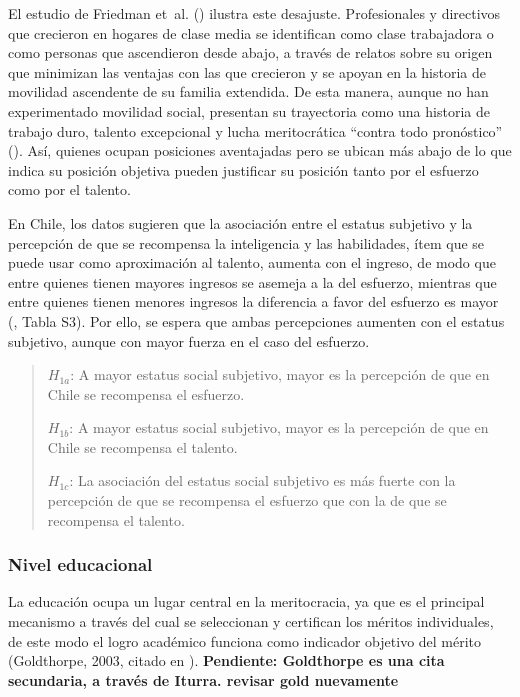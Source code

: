 \documentclass[
  spanish,
  a4paper,
  oneside]{scrbook}
\begin{document}
El estudio de Friedman et~al.
() ilustra este desajuste.
Profesionales y directivos que crecieron en hogares de clase media se
identifican como clase trabajadora o como personas que ascendieron desde
abajo, a través de relatos sobre su origen que minimizan las ventajas
con las que crecieron y se apoyan en la historia de movilidad ascendente
de su familia extendida. De esta manera, aunque no han experimentado
movilidad social, presentan su trayectoria como una historia de trabajo
duro, talento excepcional y lucha meritocrática ``contra todo
pronóstico'' (). Así, quienes ocupan posiciones aventajadas pero se
ubican más abajo de lo que indica su posición objetiva pueden justificar
su posición tanto por el esfuerzo como por el talento.

En Chile, los datos sugieren que la asociación entre el estatus
subjetivo y la percepción de que se recompensa la inteligencia y las
habilidades, ítem que se puede usar como aproximación al talento,
aumenta con el ingreso, de modo que entre quienes tienen mayores
ingresos se asemeja a la del esfuerzo, mientras que entre quienes tienen
menores ingresos la diferencia a favor del esfuerzo es mayor
(, Tabla S3). Por ello, se espera que ambas percepciones aumenten
con el estatus subjetivo, aunque con mayor fuerza en el caso del
esfuerzo.

\begin{quote}
\(H_{1a}\): A mayor estatus social subjetivo, mayor es la percepción de
que en Chile se recompensa el esfuerzo.

\(H_{1b}\): A mayor estatus social subjetivo, mayor es la percepción de
que en Chile se recompensa el talento.

\(H_{1c}\): La asociación del estatus social subjetivo es más fuerte con
la percepción de que se recompensa el esfuerzo que con la de que se
recompensa el talento.
\end{quote}

\subsubsection{Nivel educacional}\label{nivel-educacional}

La educación ocupa un lugar central en la meritocracia, ya que es el
principal mecanismo a través del cual se seleccionan y certifican los
méritos individuales, de este modo el logro académico funciona como
indicador objetivo del mérito (Goldthorpe, 2003, citado en
). \textbf{Pendiente: Goldthorpe es una cita secundaria, a través de
Iturra. revisar gold nuevamente}
\end{document}
